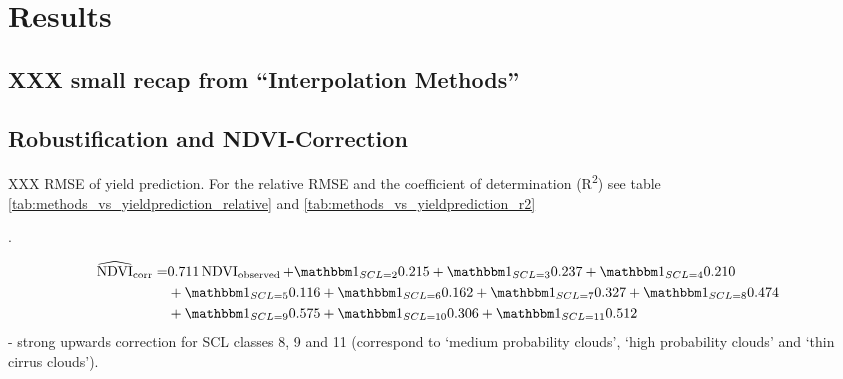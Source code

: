\chapter{Results}
\section{XXX small recap from ``Interpolation Methods''}

\section{Robustification and NDVI-Correction}
\begin{table}
	\begin{center}
		\caption{XXX RMSE of yield prediction. For the relative RMSE and the coefficient of determination (R\textsuperscript{2}) see table \ref{tab:methods_vs_yieldprediction_relative} and \ref{tab:methods_vs_yieldprediction_r2}}.
		\small
		
		\label{tab:methods_vs_yieldprediction}
		\normalsize
	\end{center}
\end{table}





\begin{equation}\label{eq:corr_lm}
	\begin{aligned}		
		\widehat{\operatorname{NDVI}}_{\text{corr}}  = &
		0.711 \operatorname{NDVI}_\text{observed}  
		+ \mathbbm 1_{{SCL = 2}} 0.215 
		+ \mathbbm 1_{{SCL = 3}} 0.237 
		+ \mathbbm 1_{{SCL = 4}} 0.210 \\ &
		+ \mathbbm 1_{{SCL = 5}} 0.116 
		+ \mathbbm 1_{{SCL = 6}} 0.162 
		+ \mathbbm 1_{{SCL = 7}} 0.327 
		+ \mathbbm 1_{{SCL = 8}} 0.474 \\ &
		+ \mathbbm 1_{{SCL = 9}} 0.575 
		+ \mathbbm 1_{{SCL = 10}} 0.306 
		+ \mathbbm 1_{{SCL = 11}} 0.512 
	\end{aligned}
\end{equation}
- strong upwards correction for SCL classes 8, 9 and 11 (correspond to `medium probability clouds', `high probability clouds' and `thin cirrus clouds').

